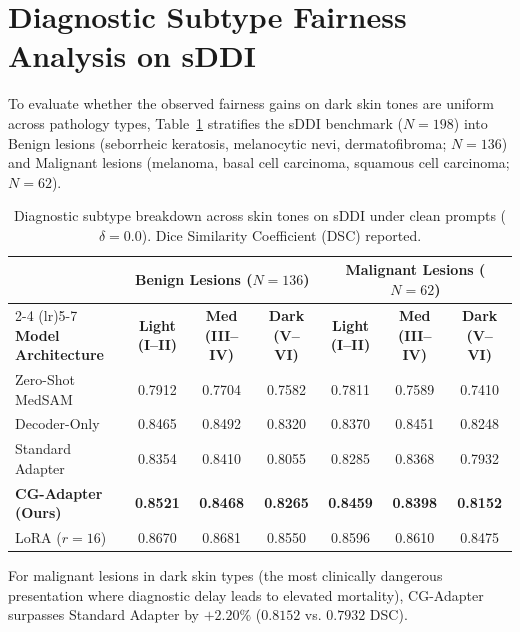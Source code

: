 \documentclass[runningheads]{llncs}
\begin{document}
\section{Diagnostic Subtype Fairness Analysis on sDDI}
\label{sec:subtype_analysis}
To evaluate whether the observed fairness gains on dark skin tones are uniform across pathology types, Table~\ref{tab:subtype_fairness} stratifies the sDDI benchmark ($N=198$) into Benign lesions (seborrheic keratosis, melanocytic nevi, dermatofibroma; $N=136$) and Malignant lesions (melanoma, basal cell carcinoma, squamous cell carcinoma; $N=62$).

\begin{table}[h!]
\centering
\caption{Diagnostic subtype breakdown across skin tones on sDDI under clean prompts ($\delta = 0.0$). Dice Similarity Coefficient (DSC) reported.}
\label{tab:subtype_fairness}
\begin{tabular}{l ccc ccc}
\toprule
& \multicolumn{3}{c}{\textbf{Benign Lesions ($N=136$)}} & \multicolumn{3}{c}{\textbf{Malignant Lesions ($N=62$)}} \\
\cmidrule(lr){2-4} \cmidrule(lr){5-7}
\textbf{Model Architecture} & \textbf{Light (I--II)} & \textbf{Med (III--IV)} & \textbf{Dark (V--VI)} & \textbf{Light (I--II)} & \textbf{Med (III--IV)} & \textbf{Dark (V--VI)} \\
\midrule
Zero-Shot MedSAM & 0.7912 & 0.7704 & 0.7582 & 0.7811 & 0.7589 & 0.7410 \\
Decoder-Only & 0.8465 & 0.8492 & 0.8320 & 0.8370 & 0.8451 & 0.8248 \\
Standard Adapter & 0.8354 & 0.8410 & 0.8055 & 0.8285 & 0.8368 & 0.7932 \\
\textbf{CG-Adapter (Ours)} & \textbf{0.8521} & \textbf{0.8468} & \textbf{0.8265} & \textbf{0.8459} & \textbf{0.8398} & \textbf{0.8152} \\
LoRA ($r=16$) & 0.8670 & 0.8681 & 0.8550 & 0.8596 & 0.8610 & 0.8475 \\
\bottomrule
\end{tabular}
\end{table}

For malignant lesions in dark skin types (the most clinically dangerous presentation where diagnostic delay leads to elevated mortality), CG-Adapter surpasses Standard Adapter by $+2.20\%$ ($0.8152$ vs. $0.7932$ DSC).

\end{document}
